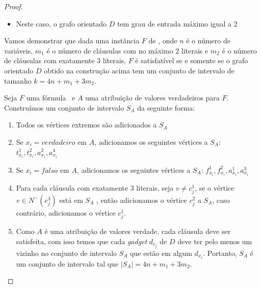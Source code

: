 \begin{theorem}
\begin{proof}
\begin{itemize}
        \item Neste caso, o grafo orientado $D$ tem grau de entrada máximo igual a 2
    \end{itemize}

Vamos demonstrar que dada uma instância $F$ de \sam, onde $n$ é o número de variáveis, $m_1$ é o número de cláusulas com no máximo 2 literais e $m_2$ é o número de cláusulas com exatamente 3 literais, $F$ é satisfatível se e somente se o grafo orientado $D$ obtido na construção acima tem um conjunto de intervalo \pd de tamanho $k = 4n + m_1 + 3m_2$.

Seja $F$ uma fórmula \sam~e $A$ uma atribuição de valores verdadeiros para $F$. Construímos um conjunto de intervalo $S_A$ da seguinte forma:

\begin{enumerate}
    \item Todos os vértices extremos são adicionados a $S_A$
    \item Se $x_i = verdadeiro$ em $A$, adicionamos os seguintes vértices a $S_A$: $t^1_{x_i}, t^2_{x_i}, a^2_{x_i}, a^4_{x_i}$
    \item Se $x_i = falso$ em $A$, adicionamos os seguintes vértices a $S_A$: $f^1_{x_i}, f^2_{x_i}, a^1_{x_i}, a^3_{x_i}$
    \item Para cada cláusula com exatamente 3 literais, seja $v \neq c^1_j$, se o vértice $v \in N^-(c^3_j)$ está em $S_A$ , então adicionamos o vértice $c^2_j$ a $S_A$, caso contrário, adicionamos o vértice $c^1_j$.
    \item Como $A$ é uma atribuição de valores verdade, cada cláusula deve ser satisfeita, com isso temos que cada \emph{gadget} $d_{c_j}$ de $D$ deve ter pelo menos um vizinho no conjunto de intervalo $S_A$ que estão em algum $d_{x_i}$. Portanto, $S_A$ é um conjunto de intervalo tal que $|S_A| = 4n+m_1+3m_2$.
\end{enumerate}


\end{proof}
\end{theorem}
